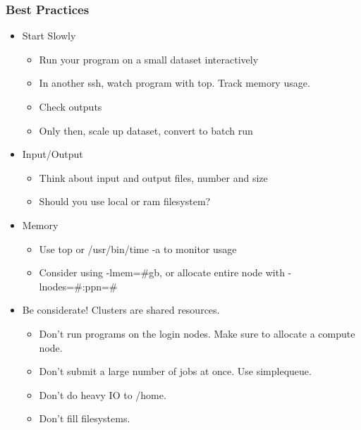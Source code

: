 \documentclass[10pt]{beamer}
\begin{document}
\begin{frame}[fragile]
\frametitle{Best Practices}

\begin{itemize}
\item Start Slowly
\begin{itemize}
\item Run your program on a small dataset interactively
\item In another ssh, watch program with top.  Track memory usage.
\item Check outputs
\item Only then, scale up dataset, convert to batch run
\end{itemize}
\item Input/Output
\begin{itemize}
\item Think about input and output files, number and size
\item Should you use local or ram filesystem? 
\end{itemize}
\item Memory

\begin{itemize}
\item Use top or /usr/bin/time -a to monitor usage
\item Consider using -lmem=\#gb, or allocate entire node with -lnodes=\#:ppn=\#
\end{itemize}

\item Be considerate!  Clusters are shared resources.

\begin{itemize}
\item Don't run programs on the login nodes.  Make sure to allocate a compute node.
\item Don't submit a large number of jobs at once.  Use simplequeue.
\item Don't do heavy IO to /home.
\item Don't fill filesystems.
\end{itemize}
\end{itemize}

\end{frame}
\end{document}
